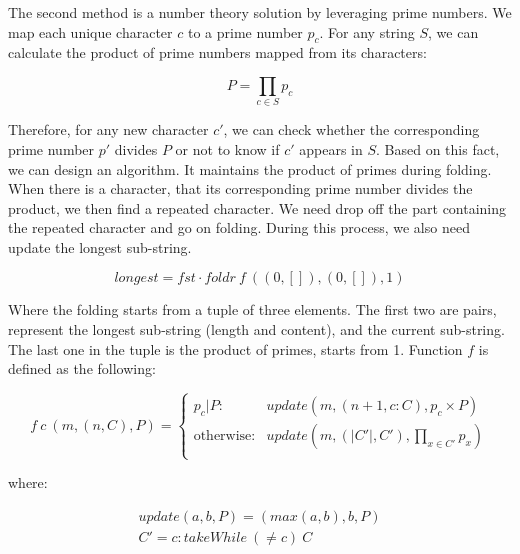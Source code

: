 \documentclass[UTF8]{article}
\begin{document}
\begin{enumerate}
The second method is a number theory solution by leveraging prime numbers. We map each unique character $c$ to a prime number $p_c$. For any string $S$, we can calculate the product of prime numbers mapped from its characters:

\[
P = \displaystyle \prod_{c \in S} p_c
\]

Therefore, for any new character $c'$, we can check whether the corresponding prime number $p'$ divides $P$ or not to know if $c'$ appears in $S$. Based on this fact, we can design an algorithm. It maintains the product of primes during folding. When there is a character, that its corresponding prime number divides the product, we then find a repeated character. We need drop off the part containing the repeated character and go on folding. During this process, we also need update the longest sub-string.

\[
longest = fst \cdot foldr\ f\ ((0, []), (0, []), 1)
\]

Where the folding starts from a tuple of three elements. The first two are pairs, represent the longest sub-string (length and content), and the current sub-string. The last one in the tuple is the product of primes, starts from 1. Function $f$ is defined as the following:

\[
f\ c\ (m, (n, C), P) = \begin{cases}
  p_c | P : & update(m, (n + 1, c : C), p_c \times P) \\
  \text{otherwise}: & update(m, (|C'|, C'), \displaystyle \prod_{x \in C'} p_x) \\
\end{cases}
\]

where:

\[ \begin{array}{l}
update(a, b, P) = (max(a, b), b, P) \\
C' = c : takeWhile\ (\neq c)\ C \\
\end{array} \]


\end{enumerate}
\end{document}
